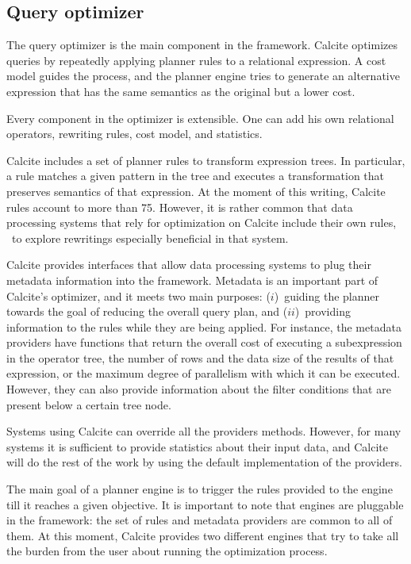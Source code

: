 \subsection{Query optimizer}
\label{subsec:optimizer}

The query optimizer is the main component in the framework. Calcite optimizes queries by repeatedly applying planner rules to a relational expression. A cost model guides the process, and the planner engine tries to generate an alternative expression that has the same semantics as the original but a lower cost.

Every component in the optimizer is extensible. One can add his own relational operators, rewriting rules, cost model, and statistics.

 Calcite includes a set of planner rules to transform expression trees. In particular, a rule matches a given pattern in the tree and executes a transformation that preserves semantics of that expression. At the moment of this writing, Calcite rules account to more than 75. However, it is rather common that data processing systems that rely for optimization on Calcite include their own rules, \eg\ to explore rewritings especially beneficial in that system.


 Calcite provides interfaces that allow data processing systems to plug their metadata information into the framework. Metadata is an important part of Calcite's optimizer, and it meets two main purposes: ($i$)~guiding the planner towards the goal of reducing the overall query plan, and ($ii$)~providing information to the rules while they are being applied. For instance, the metadata providers have functions that return the overall cost of executing a subexpression in the operator tree, the number of rows and the data size of the results of that expression, or the maximum degree of parallelism with which it can be executed. However, they can also provide information about the filter conditions that are present below a certain tree node.

Systems using Calcite can override all the providers methods. However, for many systems it is sufficient to provide statistics about their input data, and Calcite will do the rest of the work by using the default implementation of the providers.


 The main goal of a planner engine is to trigger the rules provided to the engine till it reaches a given objective. It is important to note that engines are pluggable in the framework: the set of rules and metadata providers are common to all of them. At this moment, Calcite provides two different engines that try to take all the burden from the user about running the optimization process.

